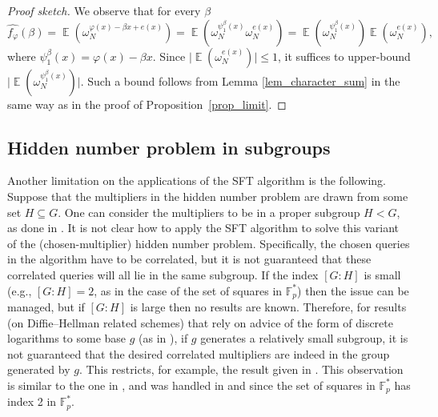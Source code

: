 \documentclass[11pt]{article}
\theoremstyle{definition}
\newcommand{\F}{{\mathbb{F}}}
\DeclareMathOperator*{\E}{\mathbb{E}}
\begin{document}
\begin{proof}[Proof sketch]
    We observe that for every $\beta$
    \[ \widehat{f_{\varphi}}(\beta)=\E\left(\omega_N^{\varphi(x)-\beta x + e(x)}\right)=\E\left(\omega_N^{\psi^\beta_1(x)}\omega_N^{e(x)}\right)= \E\left(\omega_N^{\psi^\beta_1(x)}\right)\E\left(\omega_N^{e(x)}\right) , \]
    where $\psi^\beta_1(x) = \varphi(x) - \beta x$.
    Since $\Big|\E\left(\omega_N^{e(x)}\right)\Big| \leq 1$, it suffices to upper-bound
    $\Big|\E\left(\omega_N^{\psi^\beta_1(x)}\right)\Big| $.
    Such a bound follows from Lemma \ref{lem_character_sum} in the same way as in the proof of Proposition~\ref{prop_limit}.
\end{proof}




\subsection{Hidden number problem in subgroups}
\label{sec_subgroups}

Another limitation on the applications of the SFT algorithm is the following. Suppose that the multipliers in the hidden number problem are drawn from some set $H \subseteq G$. One can consider the multipliers to be in a proper subgroup $H < G$, as done in \cite{GVS, SW}. It is not clear how to apply the SFT algorithm to solve this variant of the (chosen-multiplier) hidden number problem. Specifically, the chosen queries in the algorithm have to be correlated, but it is not guaranteed that these correlated queries will all lie in the same subgroup.
If the index $[G:H]$ is small (e.g., $[G:H] = 2$, as in the case of the set of squares in $\F_p^*$) then the issue can be managed, but if $[G:H]$ is large then no results are known.
Therefore, for results (on Diffie--Hellman related schemes) that rely on advice of the form of discrete logarithms to some base $g$ (as in \cite{AKA-HNP,BV2,SW2}), if $g$ generates a relatively small subgroup, it is not guaranteed that the desired correlated multipliers are indeed in the group generated by $g$. This restricts, for example, the result given in \cite[Section 5]{AKA-HNP}. This observation is similar to the one in \cite[Section 2.5]{Shparlinski}, and was handled in \cite[Section 5]{BS} and \cite[4.1]{Duc} since the set of squares in $\F^*_p$ has index 2 in $\F^*_p$.
\end{document}
